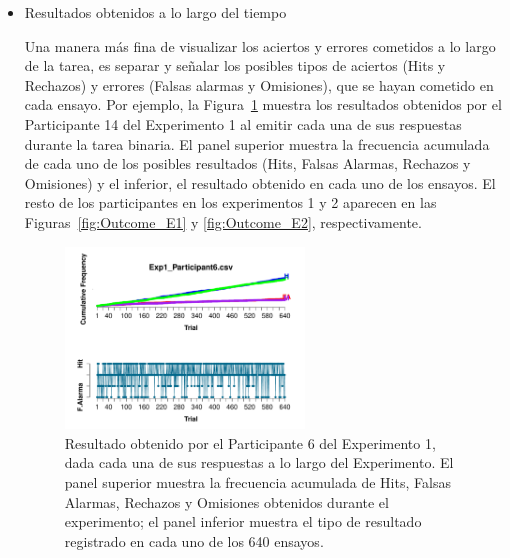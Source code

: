 \begin{itemize}
Las Figuras~\ref{fig:Success_E1} y \ref{fig:Success_E2} muestran los aciertos y errores acumulados y cometidos a lo largo del tiempo para el resto de los participantes en los experimentos 1 y 2, respectivamente.


\item Resultados obtenidos a lo largo del tiempo

Una manera más fina de visualizar los aciertos y errores cometidos a lo largo de la tarea, es separar y señalar los posibles tipos de aciertos (Hits y Rechazos) y errores (Falsas alarmas y Omisiones), que se hayan cometido en cada ensayo. Por ejemplo, la Figura~\ref{fig:Outcome_E1_P14} muestra los resultados obtenidos por el Participante 14 del Experimento 1 al emitir cada una de sus respuestas durante la tarea binaria. El panel superior muestra la frecuencia acumulada de cada uno de los posibles resultados (Hits, Falsas Alarmas, Rechazos y Omisiones) y el inferior, el resultado obtenido en cada uno de los ensayos. El resto de los participantes en los experimentos 1 y 2 aparecen en las Figuras~\ref{fig:Outcome_E1} y \ref{fig:Outcome_E2}, respectivamente.

\begin{figure}[th]
\centering
\includegraphics[width=0.60\textwidth]{Figures/Outcome_Exp1_P6}
\caption[Resultado obtenido a lo largo del tiempo: Ejemplo]{Resultado obtenido por el Participante 6 del Experimento 1, dada cada una de sus respuestas a lo largo del Experimento. El panel superior muestra la frecuencia acumulada de Hits, Falsas Alarmas, Rechazos y Omisiones obtenidos durante el experimento; el panel inferior muestra el tipo de resultado registrado en cada uno de los 640 ensayos.}
\label{fig:Outcome_E1_P14}
\end{figure}



\end{itemize}

